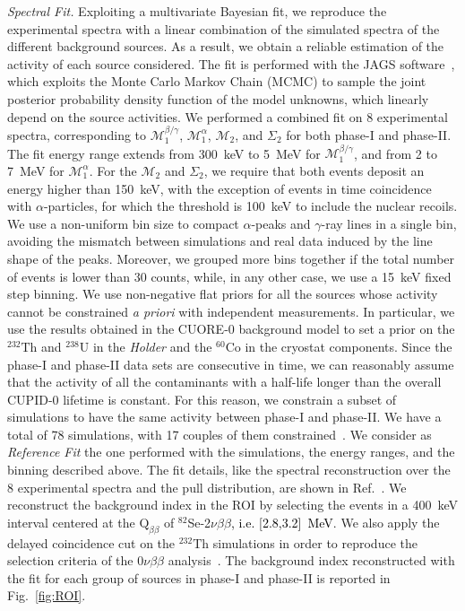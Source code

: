 \documentclass[%
reprint,
superscriptaddress,
altaffilletter,
showpacs,
showkeys,
amsmath, amssymb, aps,prl, floatfix,
]{revtex4-1}
\newcommand{\se}{$^{82}$Se\xspace}
\newcommand{\onu}{$0\nu\beta \beta$\xspace}
\newcommand{\THO}{$^{232}\mathrm{Th}$\xspace}
\newcommand{\UR}{$^{238}\mathrm{U}$\xspace}
\newcommand{\QBB}{$\mathrm{Q}_{\beta\beta}$\xspace}
\newcommand{\vv}{2$\nu\beta\beta$\xspace}
\newcommand{\mspeconea}{$\mathcal{M}^{\alpha}_{1}$\xspace}
\newcommand{\mspeconeb}{$\mathcal{M}^{\beta/\gamma}_{1}$\xspace}
\newcommand{\mspectwo}{$\mathcal{M}_2$\xspace}
\newcommand{\summspectwo}{$\Sigma_2$\xspace}
\newcommand{\phone}{phase-I\xspace}
\newcommand{\phtwo}{phase-II\xspace}
\begin{document}
{\it Spectral Fit.} Exploiting a multivariate Bayesian fit, we reproduce the experimental spectra with a linear combination of the simulated spectra of the different background sources. 
As a result, we obtain a reliable estimation of the activity of each source considered. The fit is performed with the JAGS software~\cite{JAGS}, which exploits the Monte Carlo Markov Chain (MCMC) to sample the joint posterior probability density function of the model unknowns, which linearly depend on the source activities.
We performed a combined fit on 8 experimental spectra, corresponding to \mspeconeb, \mspeconea, \mspectwo, and \summspectwo for both \phone and \phtwo. The fit energy range extends from 300~keV to 5~MeV for \mspeconeb, and from 2 to 7~MeV for \mspeconea. For the \mspectwo and \summspectwo, we require that both events deposit an energy higher than 150~keV, with the exception of events in time coincidence with $\alpha$-particles, for which the threshold is 100~keV to include the nuclear recoils. We use a non-uniform bin size to compact $\alpha$-peaks and $\gamma$-ray lines in a single bin, avoiding the mismatch between simulations and real data induced by the line shape of the peaks. Moreover, we grouped more bins together if the total number of events is lower than 30 counts, while, in any other case, we use a 15~keV fixed step binning. We use non-negative flat priors for all the sources whose activity cannot be constrained \textit{a priori} with independent measurements. In particular, we use the results obtained in the CUORE-0 background model to set a prior on the \THO and \UR in the \textit{Holder} and the $^{60}$Co in the cryostat components. Since the \phone and \phtwo data sets are consecutive in time, we can reasonably assume that the activity of all the contaminants with a half-life longer than the overall CUPID-0 lifetime is constant. For this reason, we constrain a subset of simulations to have the same activity between \phone and \phtwo.
We have a total of 78 simulations, with 17 couples of them constrained~\cite{Supplemental}. We consider as \textit{Reference Fit} the one performed with the simulations, the energy ranges, and the binning described above. The fit details, like the spectral reconstruction over the 8 experimental spectra and the pull distribution, are shown in Ref.~\cite{Supplemental}.
We reconstruct the background index in the ROI by selecting the events in a 400~keV interval centered at the \QBB of \se-\vv \textcolor{black}{, i.e. [2.8,3.2]~MeV}.
We also apply the delayed coincidence cut on the \THO simulations in order to reproduce the selection criteria of the \onu analysis~\cite{CUPID:2022puj,Azzolini:2019nmi}. 
The background index reconstructed with the fit for each group of sources in \phone and \phtwo is reported in Fig.~\ref{fig:ROI}. 
\end{document}
